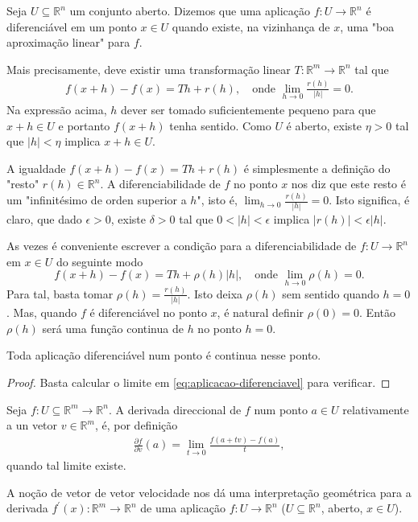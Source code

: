 Seja $U\subseteq \mathbb{R}^{n}$ um conjunto aberto. Dizemos que uma aplicação $f:U\to\mathbb{R}^{n}$ é diferenciável em um ponto $x\in U$ quando existe, na vizinhança de $x$, uma "boa aproximação linear" para $f$.

Mais precisamente, deve existir uma transformação linear $T:\mathbb{R}^{m}\to\mathbb{R}^{n}$ tal que
\begin{align*}
  f(x+h)-f(x)=Th+r(h),\quad\text{onde }\lim_{h \to 0}\frac{r(h)}{|h|}=0.
\end{align*}
Na expressão acima, $h$ dever ser tomado suficientemente pequeno para que $x+h\in U$ e portanto $f(x+h)$ tenha sentido. Como $U$ é aberto, existe $\eta>0$ tal que $|h|<\eta$ implica $x+h\in U$.

A igualdade $f(x+h)-f(x)=Th+r(h)$ é simplesmente a definição do "resto" $r(h)\in\mathbb{R}^{n}$. A diferenciabilidade de $f$ no ponto $x$ nos diz que este resto é um "infinitésimo de orden superior a $h$", isto é, $\displaystyle \lim_{h \to 0}\frac{r(h)}{|h|}=0$. Isto significa, é claro, que dado $\epsilon>0$, existe $\delta>0$ tal que $0< |h|<\epsilon$ implica $|r(h)|<\epsilon |h|$.

As vezes é conveniente escrever a condição para a diferenciabilidade de $f:U\to\mathbb{R}^{n}$ em $x\in U$ do seguinte modo
\begin{equation}\label{eq:aplicacao-diferenciavel}
  f(x+h)-f(x)=Th + \rho(h)|h|,\quad\text{onde }\lim_{h \to 0}\rho(h)=0.
\end{equation}
Para tal, basta tomar $\rho(h)=\frac{r(h)}{|h|}$. Isto deixa $\rho(h)$ sem sentido quando $h=0$. Mas, quando $f$ é diferenciável no ponto $x$, é natural definir $\rho(0)=0$. Então $\rho(h)$ será uma função continua de $h$ no ponto $h=0$.
\begin{corollary}
  Toda aplicação diferenciável num ponto é continua nesse ponto.
\end{corollary}
\begin{proof} 
  Basta calcular o limite em \eqref{eq:aplicacao-diferenciavel} para verificar.
\end{proof}
\begin{definition}
  Seja $f:U\subseteq\mathbb{R}^{m}\to\mathbb{R}^{n}$. A derivada direccional de $f$ num ponto $a\in U$ relativamente a un vetor $v\in\mathbb{R}^{m}$, é, por definição
  \begin{align*}
    \frac{\partial f}{\partial v}(a)=\lim_{t \to 0}\frac{f(a+tv)-f(a)}{t},
  \end{align*}
  quando tal limite existe.
\end{definition}
A noção de vetor de vetor velocidade nos dá uma interpretação geométrica para a derivada $f^\prime(x):\mathbb{R}^{m}\to\mathbb{R}^{n}$ de uma aplicação $f:U\to\mathbb{R}^{n}$ ($U\subseteq \mathbb{R}^{n}$, aberto, $x\in U$).


